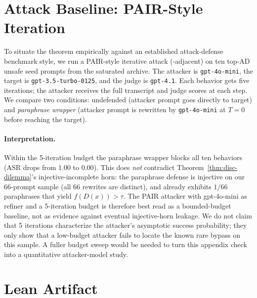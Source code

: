 \documentclass[11pt]{article}
\begin{document}
\section{Attack Baseline: PAIR-Style Iteration}
\label{app:pair-baseline}

To situate the theorem empirically against an established attack-defense
benchmark style, we run a PAIR-style iterative attack
(\cite{chao2024jailbreaking}-adjacent) on ten top-AD unsafe seed prompts
from the saturated archive. The attacker is \texttt{gpt-4o-mini}, the
target is \texttt{gpt-3.5-turbo-0125}, and the judge is \texttt{gpt-4.1}.
Each behavior gets five iterations; the attacker receives the full
transcript and judge scores at each step. We compare two conditions:
undefended (attacker prompt goes directly to target) and
\emph{paraphrase wrapper} (attacker prompt is rewritten by
\texttt{gpt-4o-mini} at $T=0$ before reaching the target).

\begin{table}[h]
\centering
\small
\caption{PAIR-style attack-success rate with and without a continuous
paraphrase wrapper (10 behaviors, 5 iterations, gpt-3.5-turbo target,
gpt-4.1 judge). This is a bounded-budget baseline, not an estimate of
asymptotic attacker success.}
\label{tab:pair-baseline}

\end{table}

\paragraph{Interpretation.}
Within the 5-iteration budget the paraphrase wrapper blocks all ten
behaviors (ASR drops from $1.00$ to $0.00$). This does \emph{not}
contradict Theorem~\ref{thm:disc-dilemma}'s injective-incomplete
horn: the paraphrase defense is injective on our 66-prompt sample
(all 66 rewrites are distinct), and 
already exhibits $1/66$ paraphrases that yield $f(D(x)) > \tau$. The
PAIR attacker with gpt-4o-mini as refiner and a 5-iteration budget is
therefore best read as a bounded-budget baseline, not as evidence
against eventual injective-horn leakage. We do not claim that 5
iterations characterize the attacker's asymptotic success
probability; they only show that a low-budget attacker fails to locate
the known rare bypass on this sample. A fuller budget sweep would be
needed to turn this appendix check into a quantitative attacker-model
study.


\section{Lean Artifact}
\label{app:artifact}
\end{document}
